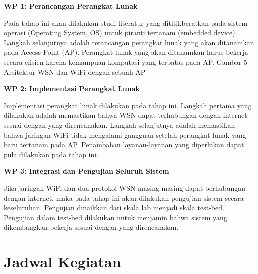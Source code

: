 \documentclass{jtetiproposalskripsi}
\begin{document}
\textbf{WP 1: Perancangan Perangkat Lunak}

Pada tahap ini akan dilakukan studi literatur yang dititikberatkan pada sistem operasi (Operating System, OS) untuk piranti tertanam (embedded device). Langkah selanjutnya adalah rerancangan perangkat lunak yang akan ditanamkan pada Access Point (AP). Perangkat lunak yang akan ditanamkan harus bekerja secara efisien karena kemampuan komputasi yang terbatas pada AP.
Gambar 5 Arsitektur WSN dan WiFi dengan sebuah AP

\textbf{WP 2: Implementasi Perangkat Lunak}

Implementasi perangkat lunak dilakukan pada tahap ini. Langkah pertama yang dilakukan adalah memastikan bahwa WSN dapat terhubungan dengan internet sesuai dengan yang direncanakan. Langkah selanjutnya adalah memastikan bahwa jaringan WiFi tidak mengalami gangguan setelah perangkat lunak yang baru tertanam pada AP. Penambahan layanan-layanan yang diperlukan dapat pula dilakukan pada tahap ini.

\textbf{WP 3: Integrasi dan Pengujian Seluruh Sistem}

Jika jaringan WiFi dan dua protokol WSN masing-masing dapat berhubungan dengan internet, maka pada tahap ini akan dilakukan pengujian sistem secara keseluruhan. Pengujian dinaikkan dari skala lab menjadi skala test-bed. Pengujian dalam test-bed dilakukan untuk menjamin bahwa sistem yang dikembangkan bekerja sesuai dengan yang direncanakan.

\section{Jadwal Kegiatan}

\end{document}
